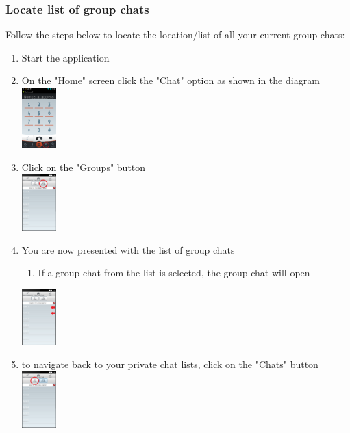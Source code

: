 \documentclass[11pt]{article}
\begin{document}
\subsubsection{Locate list of group chats} \label{locate}
Follow the steps below to locate the location/list of all your current group chats:
\begin{enumerate}
\item Start the application
\item On the "Home" screen click the "Chat" option as shown in the diagram\\
\includegraphics[width=50px]{images/mainScreen.png}
\item Click on the "Groups" button\\

\includegraphics[width=50px]{images/ChatlistNav.png}
\item You are now presented with the list of group chats
\begin{enumerate}
\item If a group chat from the list is selected, the group chat will open\\
\end{enumerate}
\includegraphics[width=50px]{images/Grouplist.png}
\item to navigate back to your private chat lists, click on the "Chats" button\\
\includegraphics[width=50px]{images/GrouplistNav.png}
\end{enumerate}
\end{document}
